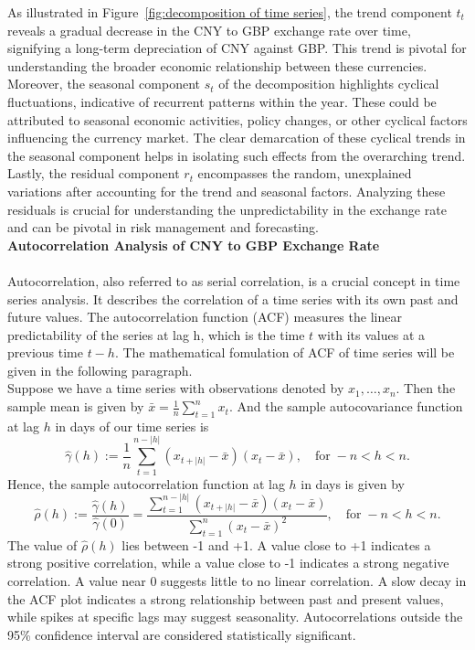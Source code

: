\documentclass{article}\usepackage[]{graphicx}\usepackage[]{xcolor}
\begin{document}
\noindent
As illustrated in Figure~\ref{fig:decomposition of time series}, the trend component $t_t$ reveals a gradual decrease in the CNY to GBP exchange rate over time, signifying a long-term depreciation of CNY against GBP. This trend is pivotal for understanding the broader economic relationship between these currencies.\\

\noindent
Moreover, the seasonal component $s_t$ of the decomposition highlights cyclical fluctuations, indicative of recurrent patterns within the year. These could be attributed to seasonal economic activities, policy changes, or other cyclical factors influencing the currency market. The clear demarcation of these cyclical trends in the seasonal component helps in isolating such effects from the overarching trend.\\

\noindent
Lastly, the residual component $r_t$ encompasses the random, unexplained variations after accounting for the trend and seasonal factors. Analyzing these residuals is crucial for understanding the unpredictability in the exchange rate and can be pivotal in risk management and forecasting.\\

\noindent
\textbf{Autocorrelation Analysis of CNY to GBP Exchange Rate}\\\\
Autocorrelation, also referred to as serial correlation, is a crucial concept in time series analysis. It describes the correlation of a time series with its own past and future values. The autocorrelation function (ACF) measures the linear predictability of the series at lag h, which is the time $t$ with its values at a previous time $t-h$. The mathematical fomulation of ACF of time series will be given in the following paragraph.\\

\noindent
Suppose we have a time series with observations denoted by \( x_1, \ldots, x_n \). Then the sample mean is given by $\bar{x} = \frac{1}{n} \sum_{t=1}^{n} x_t.$
And the sample autocovariance function at lag $h$ in days of our time series is
\[\hat{\gamma}(h) := \frac{1}{n} \sum_{t=1}^{n-|h|} (x_{t+|h|} - \bar{x})(x_t - \bar{x}), \quad \text{for} \; -n < h < n.\]
Hence, the sample autocorrelation function at lag $h$ in days is given by
\[\hat{\rho}(h) := \frac{\hat{\gamma}(h)}{\hat{\gamma}(0)} = \frac{\sum_{t=1}^{n-|h|} (x_{t+|h|} - \bar{x})(x_t - \bar{x})}{\sum_{t=1}^{n} (x_t - \bar{x})^{2}}, \quad \text{for} \; -n < h < n.\]
\noindent
The value of $\hat{\rho}(h)$ lies between -1 and +1. A value close to +1 indicates a strong positive correlation, while a value close to -1 indicates a strong negative correlation. A value near 0 suggests little to no linear correlation. A slow decay in the ACF plot indicates a strong relationship between past and present values, while spikes at specific lags may suggest seasonality. Autocorrelations outside the 95\% confidence interval are considered statistically significant.\\
\end{document}
